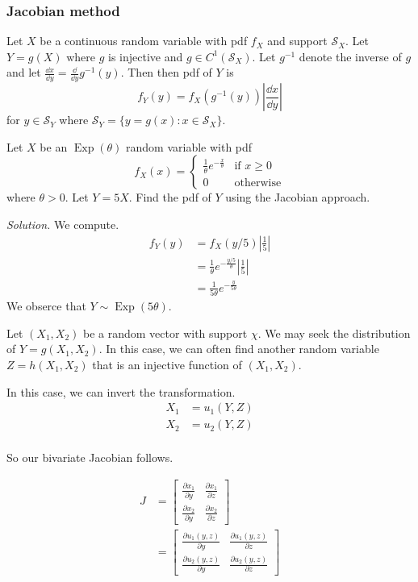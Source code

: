 \subsubsection*{Jacobian method}

Let $X$ be a continuous random variable with pdf $f_X$ and support $\mathcal S_X$. Let $Y=g(X)$ where $g$ is injective and $g\in C^1(\mathcal S_X)$. Let $g^{-1}$ denote the inverse of $g$ and let $\frac{\dd x}{\dd y}=\frac{\dd{}}{\dd y}g^{-1}(y)$. Then then pdf of $Y$ is $$f_Y(y)=f_X(g^{-1}(y))\left|\frac{\dd x}{\dd y}\right|$$ for $y\in\mathcal S_Y$ where $\mathcal S_Y=\{y=g(x):x\in\mathcal S_X\}$.

\begin{example}[]\label{ex:exptheta}
	Let $X$ be an $\operatorname{Exp}(\theta)$ random variable with pdf
	$$f_X(x)=\begin{cases}
		\frac 1\theta e^{-\frac x\theta} & \text{if $x\geq 0$}\\
		0 & \text{otherwise}
	\end{cases}$$
	where $\theta >0$. Let $Y=5X$. Find the pdf of $Y$ using the Jacobian approach.

	\textit{Solution.} We compute.
	\begin{align*}
		f_Y(y)&=f_X(y/5)\left|\frac 15\right|\\
		&=\frac 1\theta e^{-\frac{y/5}\theta}\left|\frac 15\right|\\
		&=\frac 1{5\theta} e^{-\frac{y}{5\theta}}
	\end{align*}
	We obserce that $Y\sim\operatorname{Exp}(5\theta)$.
\end{example}

Let $(X_1,X_2)$ be a random vector with support $\chi$. We may seek the distribution of $Y=g(X_1,X_2)$. In this case, we can often find another random variable $Z=h(X_1,X_2)$ that is an injective function of $(X_1,X_2)$.

In this case, we can invert the transformation.
\begin{align*}
	X_1&=u_1(Y,Z)\\
	X_2&=u_2(Y,Z)\\
\end{align*}

So our bivariate Jacobian follows.

\begin{align*}
	J&=\begin{bmatrix}
	\frac{\partial x_1}{\partial y} & \frac{\partial x_1}{\partial z}\\
	\frac{\partial x_2}{\partial y} & \frac{\partial x_2}{\partial z}
	\end{bmatrix}\\
	&=\begin{bmatrix}
	\frac{\partial u_1(y,z)}{\partial y} & \frac{\partial u_1(y,z)}{\partial z}\\
	\frac{\partial u_2(y,z)}{\partial y} & \frac{\partial u_2(y,z)}{\partial z}
	\end{bmatrix}\\
\end{align*}

